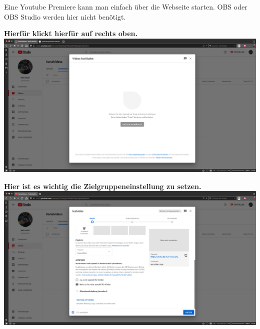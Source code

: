 

Eine Youtube Premiere kann man einfach über die Webseite starten.
OBS oder OBS Studio werden hier nicht benötigt. \\


\newpage


{\vspace{0.2cm}}
\begin{center}
  \textbf{Hierfür klickt hierfür auf  rechts oben.} \\
  {\vspace{0.3cm}}
  \includegraphics[width=\textwidth]{./pictures/premiere1.png}
\end{center}



\begin{center}
  \textbf{Hier ist es wichtig die Zielgruppeneinstellung zu setzen.} \\
  {\vspace{0.3cm}}
  \includegraphics[width=\textwidth]{./pictures/premiere2.png}
\end{center}

